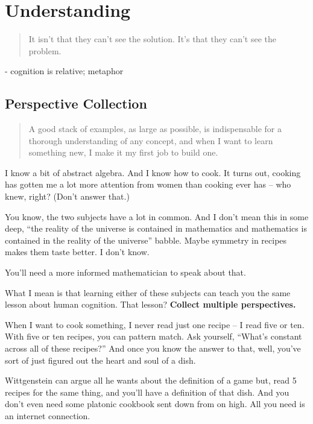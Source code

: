 \chapter{Understanding}

\begin{quote}
It isn't that they can't see the solution. It's that they can't see the problem.
\end{quote}

- cognition is relative; metaphor



\section{Perspective Collection}

\begin{quote}
A good stack of examples, as large as possible, is indispensable for a thorough
understanding of any concept, and when I want to learn something new, I make it
my first job to build one.
\end{quote}

I know a bit of abstract algebra. And I know how to cook. It turns out, cooking
has gotten me a lot more attention from women than cooking ever has -- who knew,
right? (Don't answer that.)

You know, the two subjects have a lot in common. And I don't mean this in some
deep, ``the reality of the universe is contained in mathematics and mathematics
is contained in the reality of the universe'' babble. Maybe symmetry in recipes
makes them taste better. I don't know.

You'll need a more informed mathematician to speak about that.

What I mean is that learning either of these subjects can teach you the same
lesson about human cognition. That lesson? \textbf{Collect multiple
  perspectives.}

When I want to cook something, I never read just one recipe -- I read five or
ten. With five or ten recipes, you can pattern match. Ask yourself, ``What's
constant across all of these recipes?'' And once you know the answer to that,
well, you've sort of just figured out the heart and soul of a dish.

Wittgenstein can argue all he wants about the definition of a game but, read 5
recipes for the same thing, and you'll have a definition of that dish. And you
don't even need some platonic cookbook sent down from on high. All you need is
an internet connection.

